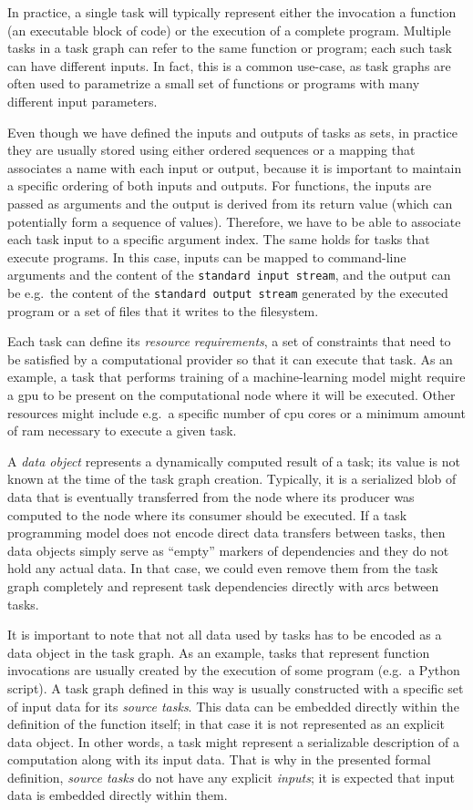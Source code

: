 In practice, a single task will typically represent either the invocation a function (an executable
block of code) or the execution of a complete program. Multiple tasks in a task graph can refer
to the same function or program; each such task can have different inputs. In fact, this is a common
use-case, as task graphs are often used to parametrize a small set of functions or programs with
many different input parameters.

Even though we have defined the inputs and outputs of tasks as sets, in
practice they are usually stored using either ordered sequences or a mapping that associates a name
with each input or output, because it is important to maintain a specific ordering of both inputs
and outputs. For functions, the inputs are passed as arguments and the output is derived from its
return value (which can potentially form a sequence of values). Therefore, we have to be able to
associate each task input to a specific argument index. The same holds for tasks that execute
programs. In this case, inputs can be mapped to command-line arguments and the content of the
\texttt{standard input stream}, and the output can be e.g.\ the content of the \texttt{standard output stream}
generated by the executed program or a set of files that it writes to the filesystem.

Each task can define its \emph{resource requirements}, a set of constraints that need to be
satisfied by a computational provider so that it can execute that task. As an example, a task that performs training of a
machine-learning model
might require a \gls{gpu} to be present on the computational node where it will be executed.
Other resources might include e.g.\ a specific number of \gls{cpu} cores or a minimum
amount of \gls{ram} necessary to execute a given task.

A \emph{data object} represents a dynamically computed result of a task; its value is not known
at the
time of the task graph creation. Typically, it is a serialized blob of data that is eventually
transferred from the node where its producer was computed to the node where its consumer should be
executed. If a task programming model does not encode direct data transfers between tasks, then
data objects simply serve as ``empty'' markers of dependencies and they do not hold any actual
data. In that case, we could even remove them from the task graph completely and represent task
dependencies directly with arcs between tasks.

It is important to note that not all data used by tasks has to be encoded as a data object in the
task graph. As an example, tasks that represent function invocations are usually created by the
execution of some program (e.g.\ a Python script). A task graph defined in this way is usually
constructed with a specific set of input data for its \emph{source tasks}. This data can be
embedded directly within the definition of the function itself; in that case it is not represented
as an explicit data object. In other words, a task might represent a serializable description of a
computation along with its input data. That is why in the presented formal definition,
\emph{source tasks} do not have any explicit \emph{inputs}; it is expected that
input data is embedded directly within them.

